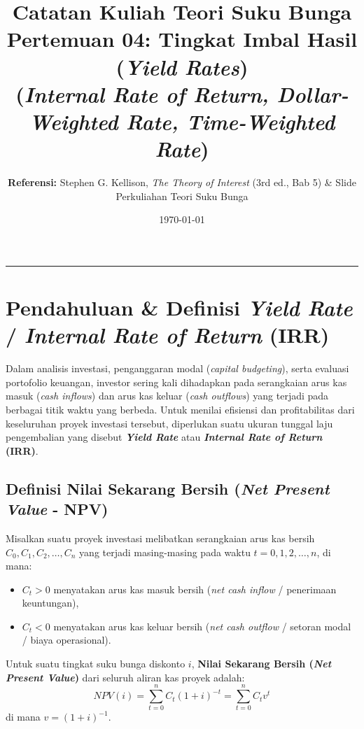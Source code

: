 \documentclass[11pt,a4paper]{article}
\title{\textbf{\LARGE Catatan Kuliah Teori Suku Bunga}\\[0.3em]
\Large Pertemuan 04: Tingkat Imbal Hasil (\textit{Yield Rates})\\
\large (\textit{Internal Rate of Return, Dollar-Weighted Rate, Time-Weighted Rate})}
\author{\textbf{Referensi:} Stephen G. Kellison, \textit{The Theory of Interest} (3rd ed., Bab 5) \& Slide Perkuliahan Teori Suku Bunga}
\date{\today}
\begin{document}
\maketitle
\tableofcontents
\vspace{1em}
\hrule
\vspace{1.5em}

\section{Pendahuluan \& Definisi \textit{Yield Rate} / \textit{Internal Rate of Return} (IRR)}

Dalam analisis investasi, penganggaran modal (\textit{capital budgeting}), serta evaluasi portofolio keuangan, investor sering kali dihadapkan pada serangkaian arus kas masuk (\textit{cash inflows}) dan arus kas keluar (\textit{cash outflows}) yang terjadi pada berbagai titik waktu yang berbeda. Untuk menilai efisiensi dan profitabilitas dari keseluruhan proyek investasi tersebut, diperlukan suatu ukuran tunggal laju pengembalian yang disebut \textbf{\textit{Yield Rate}} atau \textbf{\textit{Internal Rate of Return} (IRR)}.

\subsection{Definisi Nilai Sekarang Bersih (\textit{Net Present Value} - NPV)}

Misalkan suatu proyek investasi melibatkan serangkaian arus kas bersih $C_0, C_1, C_2, \dots, C_n$ yang terjadi masing-masing pada waktu $t = 0, 1, 2, \dots, n$, di mana:
\begin{itemize}[leftmargin=1.5em]
    \item $C_t > 0$ menyatakan arus kas masuk bersih (\textit{net cash inflow} / penerimaan keuntungan),
    \item $C_t < 0$ menyatakan arus kas keluar bersih (\textit{net cash outflow} / setoran modal / biaya operasional).
\end{itemize}

\begin{definitionbox}
Untuk suatu tingkat suku bunga diskonto $i$, \textbf{Nilai Sekarang Bersih (\textit{Net Present Value})} dari seluruh aliran kas proyek adalah:
\begin{equation}
    NPV(i) = \sum_{t=0}^n C_t (1 + i)^{-t} = \sum_{t=0}^n C_t v^t
\end{equation}
di mana $v = (1 + i)^{-1}$.
\end{definitionbox}
\end{document}
